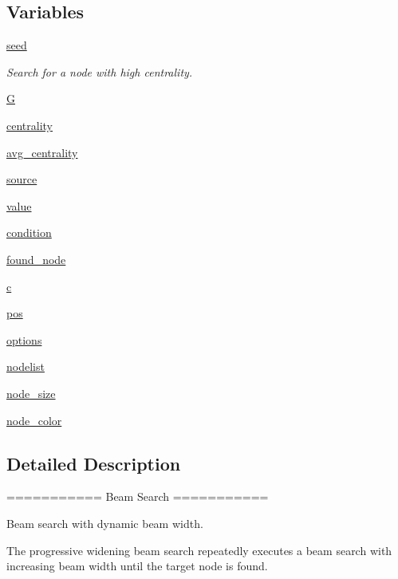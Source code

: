 \subsection*{Variables}
\begin{DoxyCompactItemize}
\item 
\hyperlink{namespaceplot__beam__search_a7496b019ca48a27ac5f30d110fe9c71d}{seed}
\begin{DoxyCompactList}\small\item\em Search for a node with high centrality. \end{DoxyCompactList}\item 
\hyperlink{namespaceplot__beam__search_a10893bc053b99c5aa8a4a19ae98104a0}{G}
\item 
\hyperlink{namespaceplot__beam__search_a2127cfdf584fcc5fceaf72a9c6962ca1}{centrality}
\item 
\hyperlink{namespaceplot__beam__search_ad7970e9a7d727e860e65a2d5bb8e47a7}{avg\+\_\+centrality}
\item 
\hyperlink{namespaceplot__beam__search_a214105633466006a101573ac80d34b35}{source}
\item 
\hyperlink{namespaceplot__beam__search_a989923cc074314f9dad692411af51033}{value}
\item 
\hyperlink{namespaceplot__beam__search_aadefc81469153d44cac9a5b2371d7fb9}{condition}
\item 
\hyperlink{namespaceplot__beam__search_a3dce5c54866e5c472535e07bd0c97312}{found\+\_\+node}
\item 
\hyperlink{namespaceplot__beam__search_a116a29b0a8cc8677b855f6e4f26bd74b}{c}
\item 
\hyperlink{namespaceplot__beam__search_a2964437dfed0dd420a36693a674d653e}{pos}
\item 
\hyperlink{namespaceplot__beam__search_a78655c0fb046a354d96db17e787acee5}{options}
\item 
\hyperlink{namespaceplot__beam__search_ad297ad4e7ff7b90bb1ffa95896776424}{nodelist}
\item 
\hyperlink{namespaceplot__beam__search_aba0c84cbbcf9fe96ec5522581bd7fdb0}{node\+\_\+size}
\item 
\hyperlink{namespaceplot__beam__search_a5229b181964523cce4292b58501de170}{node\+\_\+color}
\end{DoxyCompactItemize}


\subsection{Detailed Description}
\begin{DoxyVerb}===========
Beam Search
===========

Beam search with dynamic beam width.

The progressive widening beam search repeatedly executes a beam search
with increasing beam width until the target node is found.
\end{DoxyVerb}
 

